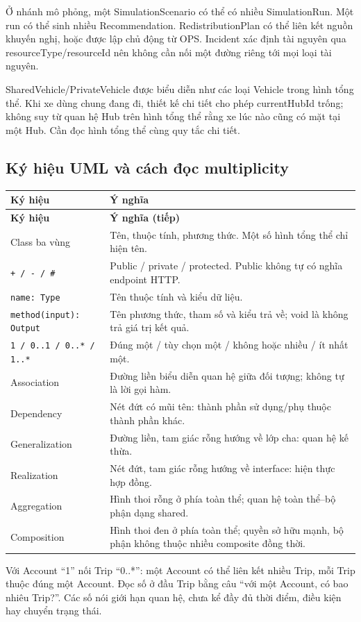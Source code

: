 \documentclass[12pt,a4paper]{article}
\newenvironment{PairTable}[2]{%
  \begin{longtable}{|L{39mm}|L{106mm}|}\hline
  \textbf{#1} & \textbf{#2}\\\hline\endfirsthead
  \hline\textbf{#1} & \textbf{#2 (tiếp)}\\\hline\endhead
}{\end{longtable}}
\begin{document}
Ở nhánh mô phỏng, một SimulationScenario có thể có nhiều SimulationRun. Một run có thể sinh nhiều Recommendation. RedistributionPlan có thể liên kết nguồn khuyến nghị, hoặc được lập chủ động từ OPS. Incident xác định tài nguyên qua resourceType/resourceId nên không cần nối một đường riêng tới mọi loại tài nguyên.

SharedVehicle/PrivateVehicle được biểu diễn như các loại Vehicle trong hình tổng thể. Khi xe dùng chung đang đi, thiết kế chi tiết cho phép currentHubId trống; không suy từ quan hệ Hub trên hình tổng thể rằng xe lúc nào cũng có mặt tại một Hub. Cần đọc hình tổng thể cùng quy tắc chi tiết.

\subsection{Ký hiệu UML và cách đọc multiplicity}
\begin{PairTable}{Ký hiệu}{Ý nghĩa}
Class ba vùng & Tên, thuộc tính, phương thức. Một số hình tổng thể chỉ hiện tên.\\\hline
\texttt{+ / - / \#} & Public / private / protected. Public không tự có nghĩa endpoint HTTP.\\\hline
\texttt{name: Type} & Tên thuộc tính và kiểu dữ liệu.\\\hline
\texttt{method(input): Output} & Tên phương thức, tham số và kiểu trả về; void là không trả giá trị kết quả.\\\hline
\texttt{1 / 0..1 / 0..* / 1..*} & Đúng một / tùy chọn một / không hoặc nhiều / ít nhất một.\\\hline
Association & Đường liền biểu diễn quan hệ giữa đối tượng; không tự là lời gọi hàm.\\\hline
Dependency & Nét đứt có mũi tên: thành phần sử dụng/phụ thuộc thành phần khác.\\\hline
Generalization & Đường liền, tam giác rỗng hướng về lớp cha: quan hệ kế thừa.\\\hline
Realization & Nét đứt, tam giác rỗng hướng về interface: hiện thực hợp đồng.\\\hline
Aggregation & Hình thoi rỗng ở phía toàn thể; quan hệ toàn thể--bộ phận dạng shared.\\\hline
Composition & Hình thoi đen ở phía toàn thể; quyền sở hữu mạnh, bộ phận không thuộc nhiều composite đồng thời.\\\hline
\end{PairTable}

Với Account ``1'' nối Trip ``0..*'': một Account có thể liên kết nhiều Trip, mỗi Trip thuộc đúng một Account. Đọc số ở đầu Trip bằng câu ``với một Account, có bao nhiêu Trip?''. Các số nói giới hạn quan hệ, chưa kể đầy đủ thời điểm, điều kiện hay chuyển trạng thái.
\end{document}
